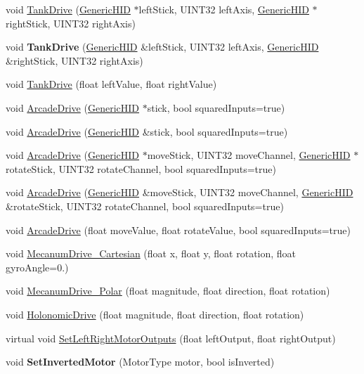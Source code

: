 \begin{DoxyCompactItemize}
\item 
void \hyperlink{classRobotDrive_ae24f3802fb94ea30c716ad8a553a1b6d}{\-Tank\-Drive} (\hyperlink{classGenericHID}{\-Generic\-H\-I\-D} $\ast$left\-Stick, \-U\-I\-N\-T32 left\-Axis, \hyperlink{classGenericHID}{\-Generic\-H\-I\-D} $\ast$right\-Stick, \-U\-I\-N\-T32 right\-Axis)
\item 
\hypertarget{classRobotDrive_a585d112865f5607d966954ae942a86bd}{void {\bfseries \-Tank\-Drive} (\hyperlink{classGenericHID}{\-Generic\-H\-I\-D} \&left\-Stick, \-U\-I\-N\-T32 left\-Axis, \hyperlink{classGenericHID}{\-Generic\-H\-I\-D} \&right\-Stick, \-U\-I\-N\-T32 right\-Axis)}\label{classRobotDrive_a585d112865f5607d966954ae942a86bd}

\item 
void \hyperlink{classRobotDrive_ac6a60f5d8ed48bae4fde0d8828ffeafe}{\-Tank\-Drive} (float left\-Value, float right\-Value)
\item 
void \hyperlink{classRobotDrive_a6f064885fe1ec7611c6d7593148b7855}{\-Arcade\-Drive} (\hyperlink{classGenericHID}{\-Generic\-H\-I\-D} $\ast$stick, bool squared\-Inputs=true)
\item 
void \hyperlink{classRobotDrive_a5ebb511c01ab5050a7f995e3f64b7ef0}{\-Arcade\-Drive} (\hyperlink{classGenericHID}{\-Generic\-H\-I\-D} \&stick, bool squared\-Inputs=true)
\item 
void \hyperlink{classRobotDrive_aa60942896141c265d0ad24f21b647dff}{\-Arcade\-Drive} (\hyperlink{classGenericHID}{\-Generic\-H\-I\-D} $\ast$move\-Stick, \-U\-I\-N\-T32 move\-Channel, \hyperlink{classGenericHID}{\-Generic\-H\-I\-D} $\ast$rotate\-Stick, \-U\-I\-N\-T32 rotate\-Channel, bool squared\-Inputs=true)
\item 
void \hyperlink{classRobotDrive_a5c3a97e06c272c3418c0b219fa574a0a}{\-Arcade\-Drive} (\hyperlink{classGenericHID}{\-Generic\-H\-I\-D} \&move\-Stick, \-U\-I\-N\-T32 move\-Channel, \hyperlink{classGenericHID}{\-Generic\-H\-I\-D} \&rotate\-Stick, \-U\-I\-N\-T32 rotate\-Channel, bool squared\-Inputs=true)
\item 
void \hyperlink{classRobotDrive_ac95118d7b535c4f3fb3d56ba5b041e40}{\-Arcade\-Drive} (float move\-Value, float rotate\-Value, bool squared\-Inputs=true)
\item 
void \hyperlink{classRobotDrive_a2e7fa1a9713332281012e8aae5d9570e}{\-Mecanum\-Drive\-\_\-\-Cartesian} (float x, float y, float rotation, float gyro\-Angle=0.)
\item 
void \hyperlink{classRobotDrive_a3ba6d4ec2c07575543c4f47d348332f1}{\-Mecanum\-Drive\-\_\-\-Polar} (float magnitude, float direction, float rotation)
\item 
void \hyperlink{classRobotDrive_ad21b09eed120e95f1b5741a26f2f9084}{\-Holonomic\-Drive} (float magnitude, float direction, float rotation)
\item 
virtual void \hyperlink{classRobotDrive_a6f17b92a6867d512188b497f192f0715}{\-Set\-Left\-Right\-Motor\-Outputs} (float left\-Output, float right\-Output)
\item 
\hypertarget{classRobotDrive_a707c3160f50bf6ddf72660f1afefdc0c}{void {\bfseries \-Set\-Inverted\-Motor} (\-Motor\-Type motor, bool is\-Inverted)}\label{classRobotDrive_a707c3160f50bf6ddf72660f1afefdc0c}


\end{DoxyCompactItemize}
